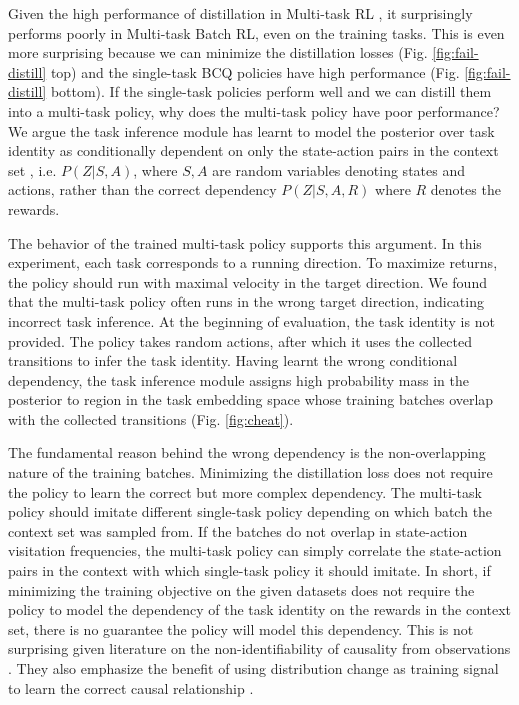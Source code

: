 Given the high performance of distillation in Multi-task RL \cite{rusu2015policy, teh2017distral, ghosh2017divide,czarnecki2019distilling, ActorMimicParisotto2015}, it surprisingly performs poorly in Multi-task Batch RL, even on the training tasks. This is even more surprising because we can minimize the distillation losses (Fig. \ref{fig:fail-distill} top) and the single-task BCQ policies have high performance (Fig. \ref{fig:fail-distill} bottom). If the single-task policies perform well and we can distill them into a multi-task policy, why does the multi-task policy have poor performance? We argue the task inference module has learnt to model the posterior over task identity as conditionally dependent on only the state-action pairs in the context set
, i.e. $P(Z|S, A)$,
where $S, A$ are random variables denoting states and actions, rather than the correct dependency $P(Z|S, A, R)$ where $R$ denotes the rewards.

The behavior of the trained multi-task policy supports this argument. In this experiment, each task corresponds to a running direction. To maximize returns, the policy should run with maximal velocity in the target direction. We found that the multi-task policy often runs in the wrong target direction, indicating incorrect task inference.
At the beginning of evaluation, the task identity is not provided.
The policy takes random actions, after which it uses the collected transitions to infer the task identity.
Having learnt the wrong conditional dependency, the task inference module assigns high probability mass in the posterior to region in the task embedding space whose training batches overlap with the collected transitions (Fig. \ref{fig:cheat}).

The fundamental reason behind the wrong dependency is the non-overlapping nature of the training batches.
Minimizing the distillation loss does not require the policy to learn the correct but more complex dependency.
The multi-task policy should imitate different single-task policy depending on which batch the context set was sampled from.
If the batches do not overlap in state-action visitation frequencies, the multi-task policy can simply correlate the state-action pairs in the context with which single-task policy it should imitate. In short, if minimizing the training objective on the given datasets does not require the policy to model the dependency of the task identity on the rewards in the context set, there is no guarantee the policy will model this dependency. This is not surprising given literature on the non-identifiability of causality from observations \cite{pearl_2009, Peters2017}. They also emphasize the benefit of using distribution change as training signal to learn the correct causal relationship \cite{Bengio2020A}.


